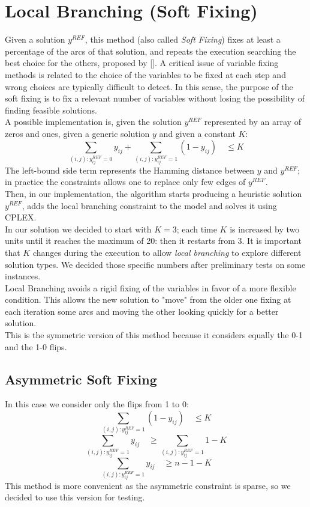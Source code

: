 \section{Local Branching (Soft Fixing)}
Given a solution $y^{REF}$, this method (also called \textit{Soft Fixing}) fixes at least a percentage of the arcs of that solution, and repeats the execution searching the best choice for the others, proposed by [\cite{fischetti2003local}]. A critical issue of variable fixing methods is related to the choice of the variables to be fixed at each step and wrong choices are typically difficult to detect. In this sense, the purpose of the soft fixing is to fix a relevant number of variables without losing the possibility of finding feasible solutions.\\
A possible implementation is, given the solution $y^{REF}$ represented by an array of zeros and ones, given a generic solution $y$ and given a constant $K$:
\[
	\sum_{(i,j):y^{REF}_{ij}=0} y_{ij} + \sum_{(i,j):y^{REF}_{ij}=1} (1-y_{ij}) \quad \leq K
\]
The left-bound side term represents the Hamming distance between $y$ and $y^{REF}$; in practice the constraints allows one to replace only few edges of $y^{REF}$. \\
Then, in our implementation, the algorithm starts producing a heuristic solution $y^{REF}$, adds the local branching constraint to the model and solves it using \textsc{CPLEX}.\\
In our solution we decided to start with $K=3$; each time $K$ is increased by two units until it reaches the maximum of 20: then it restarts from 3. It is important that $K$ changes during the execution to allow \textit{local branching} to explore different solution types. We decided those specific numbers after preliminary tests on some instances.\\
Local Branching avoids a rigid fixing of the variables in favor of a more flexible condition. This allows the new solution to "move" from the older one fixing at each iteration some arcs and moving the other looking quickly for a better solution.\\
This is the symmetric version of this method because it considers equally the 0-1 and the 1-0 flips. 
\newpage
\subsection{Asymmetric Soft Fixing}
In this case we consider only the flips from 1 to 0:
\[
	\sum_{(i,j):y^{REF}_{ij}=1} (1-y_{ij}) \quad \leq K
\]
\[
	\sum_{(i,j):y^{REF}_{ij}=1} y_{ij} \quad \geq \sum_{(i,j):y^{REF}_{ij}=1} 1 - K
\]
\[
	\sum_{(i,j):y^{REF}_{ij}=1} y_{ij} \quad \geq n - 1 - K
\]
This method is more convenient as the asymmetric constraint is sparse, so we decided to use this version for testing. 
